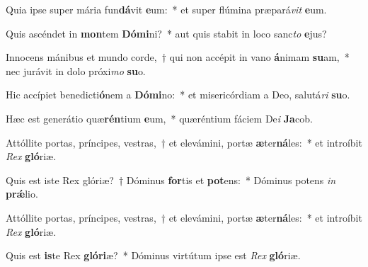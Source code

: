 \item Quia ipse super mária fun\textbf{dá}vit \textbf{e}um:~* et super flúmina præpará\textit{vit} \textbf{e}um.
\item Quis ascéndet in \textbf{mon}tem \textbf{Dó}\textbf{mi}ni?~* aut quis stabit in loco sanc\textit{to} \textbf{e}jus?
\item Innocens mánibus et mundo corde,~† qui non accépit in vano \textbf{á}nimam \textbf{su}am,~* nec jurávit in dolo próxi\textit{mo} \textbf{su}o.
\item Hic accípiet benedicti\textbf{ó}nem a \textbf{Dó}\textbf{mi}no:~* et misericórdiam a Deo, salutá\textit{ri} \textbf{su}o.
\item Hæc est generátio quæ\textbf{rén}tium \textbf{e}um,~* quæréntium fáciem De\textit{i} \textbf{Ja}cob.
\item Attóllite portas, príncipes, vestras,~† et elevámini, portæ \textbf{æ}ter\textbf{ná}les:~* et introíbit \textit{Rex} \textbf{gló}riæ.
\item Quis est iste Rex glóriæ?~† Dóminus \textbf{for}tis et \textbf{pot}ens:~* Dóminus potens \textit{in} \textbf{prǽ}lio.
\item Attóllite portas, príncipes, vestras,~† et elevámini, portæ \textbf{æ}ter\textbf{ná}les:~* et introíbit \textit{Rex} \textbf{gló}riæ.
\item Quis est \textbf{is}te Rex \textbf{gló}\textbf{ri}æ?~* Dóminus virtútum ipse est \textit{Rex} \textbf{gló}riæ.
